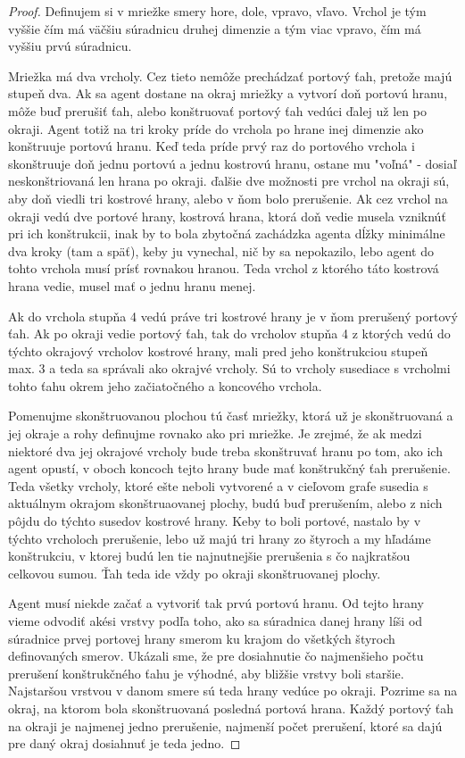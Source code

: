 \begin{proof}
Definujem si v mriežke smery hore, dole, vpravo, vľavo. Vrchol je tým vyššie
čím má väčšiu súradnicu druhej dimenzie a tým viac vpravo, čím má vyššiu
prvú súradnicu.

Mriežka má dva vrcholy. Cez tieto nemôže prechádzať portový ťah, pretože
majú stupeň dva. Ak sa agent dostane na okraj mriežky a vytvorí doň portovú
hranu, môže buď prerušiť ťah, alebo konštruovať portový ťah vedúci ďalej už
len po okraji. Agent totiž na tri kroky príde do vrchola po hrane inej
dimenzie ako konštruuje portovú hranu. Keď teda príde prvý raz do portového
vrchola i skonštruuje doň jednu portovú a jednu kostrovú hranu, ostane mu
"voľná" - dosiaľ neskonštriovaná len hrana po okraji. ďalšie dve možnosti
pre vrchol na okraji sú, aby doň viedli tri kostrové hrany, alebo v ňom bolo
prerušenie. Ak cez vrchol na okraji vedú dve portové hrany, kostrová hrana,
ktorá doň vedie musela vzniknúť pri ich konštrukcii, inak by to bola
zbytočná zachádzka agenta dĺžky minimálne dva kroky (tam a späť), keby ju
vynechal, nič by sa nepokazilo, lebo agent do tohto vrchola musí prísť
rovnakou hranou. Teda vrchol z ktorého táto kostrová hrana vedie, musel mať
o jednu hranu menej.

Ak do vrchola stupňa 4 vedú práve tri kostrové hrany je v ňom prerušený portový
ťah. Ak po okraji vedie portový ťah, tak do vrcholov stupňa 4 z ktorých vedú do
týchto okrajový vrcholov kostrové hrany, mali pred jeho konštrukciou stupeň
max. 3 a teda sa správali ako okrajvé vrcholy. Sú to vrcholy susediace s
vrcholmi tohto ťahu okrem jeho začiatočného a koncového vrchola.

Pomenujme skonštruovanou plochou tú časť mriežky, ktorá už je skonštruovaná
a jej okraje a rohy definujme rovnako ako pri mriežke. Je zrejmé, že ak
medzi niektoré dva jej okrajové vrcholy bude treba skonštruvať hranu po tom,
ako ich agent opustí, v oboch koncoch tejto hrany bude mať konštrukčný ťah 
prerušenie. Teda všetky vrcholy, ktoré ešte neboli vytvorené a v cieľovom
grafe susedia s aktuálnym okrajom skonštruaovanej plochy, budú buď
prerušením, alebo z nich pôjdu do týchto susedov kostrové hrany. Keby to
boli portové, nastalo by v týchto vrcholoch prerušenie, lebo už majú tri
hrany zo štyroch a my hľadáme konštrukciu, v ktorej budú len tie
najnutnejšie prerušenia s čo najkratšou celkovou sumou. Ťah teda ide vždy po
okraji skonštruovanej plochy.

Agent musí niekde začať a vytvoriť tak prvú portovú hranu. Od tejto hrany
vieme odvodiť akési vrstvy podľa toho, ako sa súradnica danej hrany líši od
súradnice prvej portovej hrany smerom ku krajom do všetkých štyroch 
definovaných smerov.
Ukázali sme, že pre dosiahnutie čo najmenšieho počtu prerušení konštrukčného
ťahu je výhodné, aby bližšie vrstvy boli staršie. Najstaršou vrstvou v danom
smere sú teda hrany vedúce po okraji. Pozrime sa na okraj, na ktorom bola
skonštruovaná posledná portová hrana. Každý portový ťah na okraji je
najmenej jedno prerušenie, najmenší počet prerušení, ktoré sa dajú pre daný
okraj dosiahnuť je teda jedno.


\end{proof}

